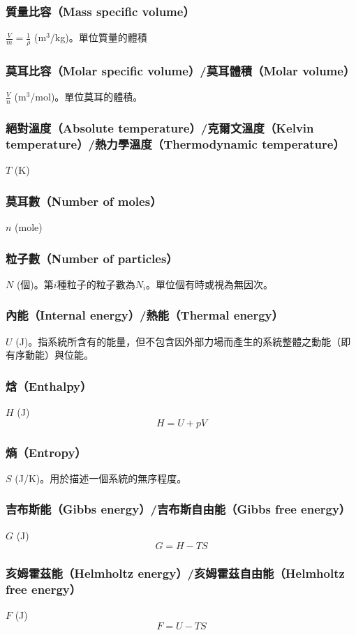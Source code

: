 \documentclass[a4paper,12pt]{report}
\begin{document}
\subsubsection{質量比容（Mass specific volume）}
$\frac{V}{m}=\frac{1}{\rho}$ (m$^3$/kg)。單位質量的體積
\subsubsection{莫耳比容（Molar specific volume）/莫耳體積（Molar volume）}
$\frac{V}{n}$ (m$^3$/mol)。單位莫耳的體積。
\subsubsection{絕對溫度（Absolute temperature）/克爾文溫度（Kelvin temperature）/熱力學溫度（Thermodynamic temperature）}
$T$ (K)
\subsubsection{莫耳數（Number of moles）}
$n$ (mole)
\subsubsection{粒子數（Number of particles）}
$N$ (個)。第$i$種粒子的粒子數為$N_i$。單位個有時或視為無因次。
\subsubsection{內能（Internal energy）/熱能（Thermal energy）}
$U$ (J)。指系統所含有的能量，但不包含因外部力場而產生的系統整體之動能（即有序動能）與位能。
\subsubsection{焓（Enthalpy）}
$H$ (J)
\[H = U + pV\]
\subsubsection{熵（Entropy）}
$S$ (J/K)。用於描述一個系統的無序程度。
\subsubsection{吉布斯能（Gibbs energy）/吉布斯自由能（Gibbs free energy）}
$G$ (J)
\[G = H - TS\]
\subsubsection{亥姆霍茲能（Helmholtz energy）/亥姆霍茲自由能（Helmholtz free energy）}
$F$ (J)
\[F = U - TS\]
\end{document}
